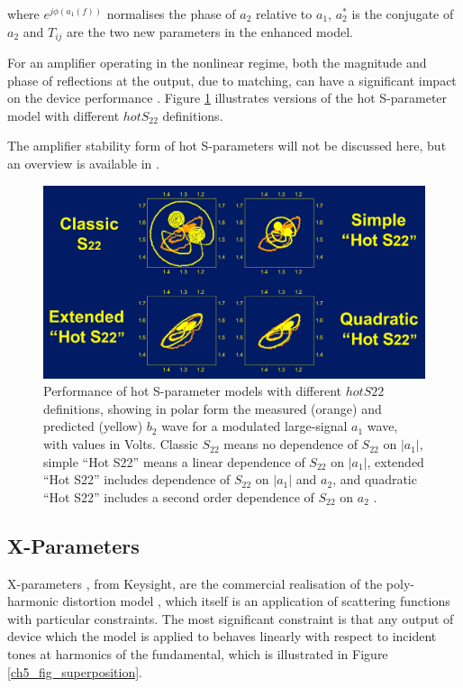 \documentclass[../thesis/thesis.tex]{subfiles}
\begin{document}
\begin{refsection}
where $e^{j\phi(a_1(f))}$ normalises the phase of $a_2$ relative to $a_1$, $a_2^*$ is the conjugate of $a_2$ and $T_{ij}$ are the two new parameters in the enhanced model.

For an amplifier operating in the nonlinear regime, both the magnitude and phase of reflections at the output, due to matching, can have a significant impact on the device performance \cite[Figure 12.13]{Cripps_2006}. Figure \ref{ch5_fig_hots22} illustrates versions of the hot S-parameter model with different $hotS_{22}$ definitions.

The amplifier stability form of hot S-parameters will not be discussed here, but an overview is available in \cite{Verspecht_2005}.

\begin{figure}
	\centering
	\includegraphics[width=\linewidth]{hots22}
	\caption[Performance of hot S-parameter models with different $hotS22$ definitions.]{Performance of hot S-parameter models with different $hotS22$ definitions, showing in polar form the measured (orange) and predicted (yellow) $b_2$ wave for a modulated large-signal $a_1$ wave, with values in Volts. Classic $S_{22}$ means no dependence of $S_{22}$ on $|a_1|$, simple ``Hot S22'' means a linear dependence of $S_{22}$ on $|a_1|$, extended ``Hot S22'' includes dependence of $S_{22}$ on $|a_1|$ and $a_2$, and quadratic ``Hot S22'' includes a second order dependence of $S_{22}$ on $a_2$ \cite{Verspecht_2002}.}
	\label{ch5_fig_hots22}
\end{figure}

\subsection{X-Parameters}

X-parameters \cite{Root_2013}, from Keysight, are the commercial realisation of the poly-harmonic distortion model \cite{Verspecht_2006}, which itself is an application of scattering functions with particular constraints. The most significant constraint is that any output of device which the model is applied to behaves linearly with respect to incident tones at harmonics of the fundamental, which is illustrated in Figure \ref{ch5_fig_superposition}. 


\end{refsection}
\end{document}
